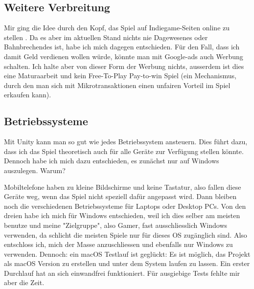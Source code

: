 \subsection{Weitere Verbreitung}

Mir ging die Idee durch den Kopf, das Spiel auf Indiegame-Seiten online zu stellen .
Da es aber im aktuellen Stand nichts nie Dagewesenes oder Bahnbrechendes ist, habe ich mich dagegen entschieden.
Für den Fall, dass ich damit Geld verdienen wollen würde, könnte man mit Google-ads auch Werbung schalten.
Ich halte aber von dieser Form der Werbung nichts, ausserdem ist dies eine Maturaarbeit und kein Free-To-Play Pay-to-win Spiel
(ein Mechanismus, durch den man sich mit Mikrotransaktionen einen unfairen Vorteil im Spiel erkaufen kann).

\subsection{Betriebssysteme}
Mit Unity kann man so gut wie jedes Betriebssystem ansteuern.
Dies führt dazu, dass ich das Spiel theoretisch auch für alle Geräte zur Verfügung stellen könnte. 
Dennoch habe ich mich dazu entschieden, es zunächst nur auf Windows auszulegen.
Warum?

Mobiltelefone haben zu kleine Bildschirme und keine Tastatur, also fallen diese Geräte weg, wenn das Spiel nicht speziell dafür angepasst wird. Dann bleiben noch die verschiedenen Betriebssysteme für Laptops oder Desktop PCs.
Von den dreien habe ich mich für Windows entschieden, weil ich dies selber am meisten benutze und meine "Zielgruppe", also Gamer, fast ausschliesslich Windows verwenden, da schlicht die meisten Spiele nur für dieses OS zugänglich sind. Also entschloss ich, mich der Masse anzuschliessen und ebenfalls nur Windows zu verwenden. Dennoch: ein macOS Testlauf ist geglückt: Es ist möglich, das Projekt als macOS Version zu erstellen und unter dem System laufen zu lassen. Ein erster Durchlauf hat an sich einwandfrei funktioniert. Für ausgiebige Tests fehlte mir aber die Zeit.
